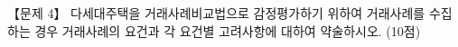 \begin{longquestion}{【문제 4】}
다세대주택을 거래사례비교법으로 감정평가하기 위하여 거래사례를 수집하는 경우 거래사례의 요건과 각 요건별 고려사항에 대하여 약술하시오. (10점) \par
\end{longquestion}
